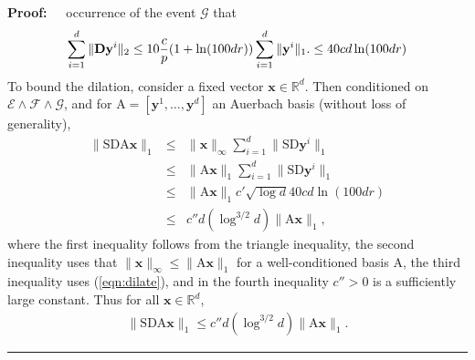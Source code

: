 \documentclass[11pt]{article}
\newenvironment{proof}{\begin{trivlist} \item {\bf Proof:~~}}
  {\qed\end{trivlist}}
\newcommand{\mat}[1]{{\ensuremath{\bm{\mathrm{#1}}}}}
\def\matA{\mat{A}}
\def\matD{\mat{D}}
\def\matS{\mat{S}}
\def\frac#1#2{{#1\over #2}}
\def\qed{\hfill\rule{2mm}{2mm}}
\def\x{{\mathbf x}}
\def\y{{\mathbf y}}
\begin{document}
\begin{proof}
occurrence of the event $\mathcal{G}$
that 
\begin{eqnarray}\label{eqn:dilate}
\sum_{i=1}^d \|\matD \y^i\|_2 \leq 10 \frac{c}{p}(1 +  \ln(100dr)) \sum_{i=1}^d \|\y^i\|_1.
\leq 40 c d \ln(100dr)
\end{eqnarray}
To bound the dilation, consider a fixed vector $\x \in \mathbb{R}^d$.
Then conditioned on $\mathcal{E} \wedge \mathcal{F} \wedge \mathcal{G}$,
and for $\matA = [\y^1, \ldots, \y^d]$ 
an Auerbach basis (without loss of generality),
\begin{eqnarray*}
\|\matS \matD \matA \x\|_1 & \leq & \|\x\|_{\infty} \sum_{i = 1}^d \|\matS \matD \y^i\|_1\\
& \leq & \|\matA \x\|_1 \sum_{i = 1}^d \|\matS \matD \y^i\|_1\\
& \leq & \|\matA \x\|_1 c' \sqrt{\log d} 40 cd \ln(100dr)\\
& \leq & c'' d (\log^{3/2} d) \|\matA \x\|_1,
\end{eqnarray*}
where the first inequality follows from the triangle inequality,
the second inequality uses that $\|\x\|_{\infty} \leq \|\matA \x\|_1$ for a
well-conditioned basis $\matA$, the third inequality uses 
(\ref{eqn:dilate}), and in the fourth inequality $c'' > 0$ is a
sufficiently large constant. Thus for all $\x \in \mathbb{R}^d$,
\begin{eqnarray}\label{eqn:dilateFinal}
\|\matS \matD \matA \x\|_1 \leq c'' d (\log^{3/2} d) \|\matA \x\|_1.
\end{eqnarray}


\end{proof}
\end{document}
